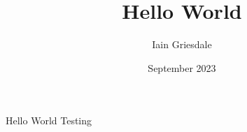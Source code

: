 \documentclass{article}
\title{Hello World}
\author{Iain Griesdale}
\date{September 2023}
\begin{document}
\maketitle

Hello World Testing
\end{document}
